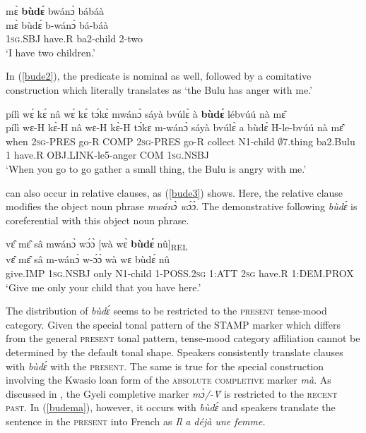 \begin{exe} 
\ex\label{bude1} 
  \glll  mɛ̀ {\bfseries bùdɛ́} bwánɔ̀ bábáà \\
        mɛ̀ bùdɛ́ b-wánɔ̀ bá-báà \\
         1\textsc{sg}.SBJ have.R ba2-child 2-two   \\
    \trans `I have two children.'
\end{exe}

\noindent In (\ref{bude2}), the predicate is nominal as well, followed by a comitative construction which literally translates as `the Bulu has anger with me.'

\begin{exe} 
\ex\label{bude2} 
  \glll pílì wɛ́ kɛ́ nâ wɛ́ kɛ́ tɔ́kɛ̀ mwánɔ̀ sáyà bvúlɛ̀ à {\bfseries bùdɛ́} lébvúú nà mɛ̂ \\
        pílì wɛ-H kɛ̀-H nâ wɛ-H kɛ̀-H tɔ́kɛ m-wánɔ̀ sáyà bvúlɛ̀ a bùdɛ́ H-le-bvúú nà mɛ̂ \\
           when 2\textsc{sg}-PRES go-R COMP 2\textsc{sg}-PRES go-R collect N1-child $\emptyset$7.thing ba2.Bulu 1 have.R OBJ.LINK-le5-anger COM 1\textsc{sg}.NSBJ \\
    \trans `When you go to go gather a small thing, the Bulu is angry with me.'
\end{exe}

 can also occur in relative clauses, as (\ref{bude3}) shows. Here, the relative clause modifies the object noun phrase {\itshape mwánɔ̀ wɔ́ɔ̀}. The demonstrative following {\itshape bùdɛ́} is coreferential with this object noun phrase.

\begin{exe} 
\ex\label{bude3}
  \glll  vɛ̂ mɛ̂ sâ mwánɔ̀ wɔ́ɔ̀ [wà wɛ̀ {\bfseries bùdɛ́} nû]\textsubscript{REL} \\
         vɛ̂ mɛ̂ sâ m-wánɔ̀ w-ɔ́ɔ̀ wà wɛ bùdɛ́ nû \\
          give.IMP 1\textsc{sg}.NSBJ only N1-child 1-POSS.2\textsc{sg} 1:ATT 2\textsc{sg} have.R 1:DEM.PROX \\
    \trans `Give me only your child that you have here.'
\end{exe}


The distribution of {\itshape bùdɛ́} seems to be restricted to the \textsc{present} tense-mood category. Given the special tonal pattern of the STAMP marker which differs from the general \textsc{present} tonal pattern, tense-mood category affiliation cannot be determined by the default tonal shape. Speakers consistently translate clauses with {\itshape bùdɛ́} with the \textsc{present}. The same is true for the special construction involving the Kwasio loan form of the \textsc{absolute completive} marker {\itshape mà}. As discussed in , the Gyeli completive marker {\itshape mɔ̀/-Ṽ} is restricted to the \textsc{recent past}. In (\ref{budema}), however, it occurs with {\itshape bùdɛ́} and speakers translate the sentence in the \textsc{present} into French as {\itshape Il a déjà une femme.} 


